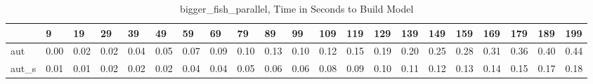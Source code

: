 \begin{table}
\centering
\caption{bigger_fish_parallel, Time in Seconds to Build Model}
\label{bigger_fish_parallel_model_time}
\begin{tabular}{lllllllllllllllllllll}
\toprule
{} &     9 &    19 &    29 &    39 &    49 &    59 &    69 &    79 &    89 &    99 &   109 &   119 &   129 &   139 &   149 &   159 &   169 &   179 &   189 &   199 \\
\midrule
aut   &  0.00 &  0.02 &  0.02 &  0.04 &  0.05 &  0.07 &  0.09 &  0.10 &  0.13 &  0.10 &  0.12 &  0.15 &  0.19 &  0.20 &  0.25 &  0.28 &  0.31 &  0.36 &  0.40 &  0.44 \\
aut\_s &  0.01 &  0.01 &  0.02 &  0.02 &  0.02 &  0.04 &  0.04 &  0.05 &  0.06 &  0.06 &  0.08 &  0.09 &  0.10 &  0.11 &  0.12 &  0.13 &  0.14 &  0.15 &  0.17 &  0.18 \\
\bottomrule
\end{tabular}
\end{table}
